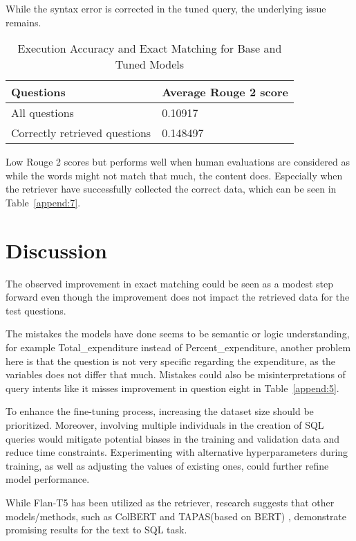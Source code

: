 \documentclass[11pt]{article}
\begin{document}
While the syntax error is corrected in the tuned query, the underlying issue remains. 



\begin{table}[h!]
\centering
\begin{tabular}{|p{}|p{}|}
\hline
\textbf{Questions} & \textbf{Average Rouge 2 score} \\ \hline
All questions           & 0.10917                   \\ \hline
Correctly retrieved questions          & 0.148497         \\ \hline          
\end{tabular}
\caption{Execution Accuracy and Exact Matching for Base and Tuned Models}
\label{tab:Rouge}
\end{table}

Low Rouge 2 scores but performs well when human evaluations are considered as while the words might not match that much, the content does. Especially when the retriever have successfully collected the correct data, which can be seen in Table~\ref{append:7}.

\section{Discussion}

The observed improvement in exact matching could be seen as a modest step forward even though the improvement does not impact the retrieved data for the test questions. 

The mistakes the models have done seems to be semantic or logic understanding, for example Total\_expenditure instead of Percent\_expenditure, another problem here is that the question is not very specific regarding the expenditure, as the variables does not differ that much. Mistakes could also be misinterpretations of query intents like it misses improvement in question eight in Table~\ref{append:5}.

To enhance the fine-tuning process, increasing the dataset size should be prioritized. Moreover, involving multiple individuals in the creation of SQL queries would mitigate potential biases in the training and validation data and reduce time constraints. Experimenting with alternative hyperparameters during training, as well as adjusting the values of existing ones, could further refine model performance.

While Flan-T5 has been utilized as the retriever, research suggests that other models/methods, such as ColBERT \cite{Lin2023} and TAPAS(based on BERT) \cite{QAdens}, demonstrate promising results for the text to SQL task.
\end{document}
